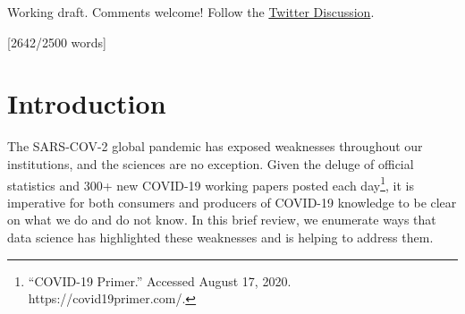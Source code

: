 \documentclass[10pt,letterpaper]{article}
\newcommand{\getIndex}[2]{
  \ForEach{,}{\IfEq{#1}{\thislevelitem}{\number\thislevelcount\ExitForEach}{}}{#2}
}
\newcommand{\getAff}[1]{
  \getIndex{#1}{University of California San Diego}
}
\begin{document}
\vspace*{0.2in}



\linenumbers

Working draft. Comments welcome! Follow the
\href{https://twitter.com/RexDouglass/status/1295391498477826053}{Twitter
Discussion}.

{[}2642/2500 words{]}

\hypertarget{introduction}{%
\section{Introduction}\label{introduction}}

The SARS-COV-2 global pandemic has exposed weaknesses throughout our
institutions, and the sciences are no exception. Given the deluge of
official statistics and 300+ new COVID-19 working papers posted each
day\footnote{``COVID-19 Primer.'' Accessed August 17, 2020.
  https://covid19primer.com/.}, it is imperative for both consumers and
producers of COVID-19 knowledge to be clear on what we do and do not
know. In this brief review, we enumerate ways that data science has
highlighted these weaknesses and is helping to address them.
\end{document}
